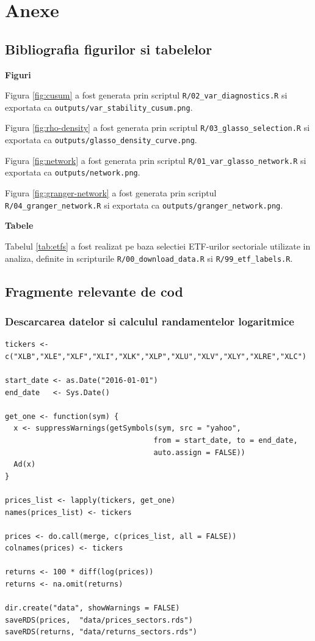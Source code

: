 \clearpage
\chapter*{Anexe}

\section{Bibliografia figurilor si tabelelor}

\textbf{Figuri}

Figura \ref{fig:cusum} a fost generata prin scriptul \texttt{R/02\_var\_diagnostics.R} si exportata ca \texttt{outputs/var\_stability\_cusum.png}.

Figura \ref{fig:rho-density} a fost generata prin scriptul \texttt{R/03\_glasso\_selection.R} si exportata ca \texttt{outputs/glasso\_density\_curve.png}.

Figura \ref{fig:network} a fost generata prin scriptul \texttt{R/01\_var\_glasso\_network.R} si exportata ca \texttt{outputs/network.png}.

Figura \ref{fig:granger-network} a fost generata prin scriptul \texttt{R/04\_granger\_network.R} si exportata ca \texttt{outputs/granger\_network.png}.

\bigskip

\textbf{Tabele}

Tabelul \ref{tab:etfs} a fost realizat pe baza selectiei ETF-urilor sectoriale utilizate in analiza, definite in scripturile \texttt{R/00\_download\_data.R} si \texttt{R/99\_etf\_labels.R}.

\section{Fragmente relevante de cod}

\subsection{Descarcarea datelor si calculul randamentelor logaritmice}

\begin{verbatim}
tickers <- c("XLB","XLE","XLF","XLI","XLK","XLP","XLU","XLV","XLY","XLRE","XLC")

start_date <- as.Date("2016-01-01")
end_date   <- Sys.Date()

get_one <- function(sym) {
  x <- suppressWarnings(getSymbols(sym, src = "yahoo",
                                  from = start_date, to = end_date,
                                  auto.assign = FALSE))
  Ad(x)
}

prices_list <- lapply(tickers, get_one)
names(prices_list) <- tickers

prices <- do.call(merge, c(prices_list, all = FALSE))
colnames(prices) <- tickers

returns <- 100 * diff(log(prices))
returns <- na.omit(returns)

dir.create("data", showWarnings = FALSE)
saveRDS(prices,  "data/prices_sectors.rds")
saveRDS(returns, "data/returns_sectors.rds")
\end{verbatim}

